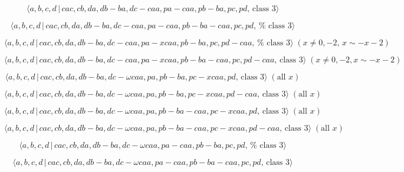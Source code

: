 \documentclass[10pt]{article}
\begin{document}
\begin{equation}
\langle a,b,c,d\,|\,cac,cb,da,db-ba,dc-caa,pa-caa,pb-ba,pc,pd,\,\text{class }%
3\rangle  \tag{7.4207}
\end{equation}

\begin{equation}
\langle a,b,c,d\,|\,cac,cb,da,db-ba,dc-caa,pa-caa,pb-ba-caa,pc,pd,\,\text{%
class }3\rangle  \tag{7.4208}
\end{equation}

\begin{equation}
\langle a,b,c,d\,|\,cac,cb,da,db-ba,dc-caa,pa-xcaa,pb-ba,pc,pd-caa,\,\text{%
class }3\rangle \;(x\neq 0,-2,\,x\sim -x-2)  \tag{7.4209}
\end{equation}

\begin{equation}
\langle a,b,c,d\,|\,cac,cb,da,db-ba,dc-caa,pa-xcaa,pb-ba-caa,pc,pd-caa,\,%
\text{class }3\rangle \;(x \neq 0,-2, x \sim -x-2)  \tag{7.4210}
\end{equation}

\begin{equation}
\langle a,b,c,d\,|\,cac,cb,da,db-ba,dc-\omega caa,pa,pb-ba,pc-xcaa,pd,\,%
\text{class }3\rangle \;(\text{all }x)  \tag{7.4211}
\end{equation}

\begin{equation}
\langle a,b,c,d\,|\,cac,cb,da,db-ba,dc-\omega caa,pa,pb-ba,pc-xcaa,pd-caa,\,%
\text{class }3\rangle \;(\text{all }x)  \tag{7.4212}
\end{equation}

\begin{equation}
\langle a,b,c,d\,|\,cac,cb,da,db-ba,dc-\omega caa,pa,pb-ba-caa,pc-xcaa,pd,\,%
\text{class }3\rangle \;(\text{all }x)  \tag{7.4213}
\end{equation}

\begin{equation}
\langle a,b,c,d\,|\,cac,cb,da,db-ba,dc-\omega
caa,pa,pb-ba-caa,pc-xcaa,pd-caa,\,\text{class }3\rangle \;(\text{all }x) 
\tag{7.4214}
\end{equation}

\begin{equation}
\langle a,b,c,d\,|\,cac,cb,da,db-ba,dc-\omega caa,pa-caa,pb-ba,pc,pd,\,\text{%
class }3\rangle  \tag{7.4215}
\end{equation}

\begin{equation}
\langle a,b,c,d\,|\,cac,cb,da,db-ba,dc-\omega caa,pa-caa,pb-ba-caa,pc,pd,\,%
\text{class }3\rangle  \tag{7.4216}
\end{equation}
\end{document}
